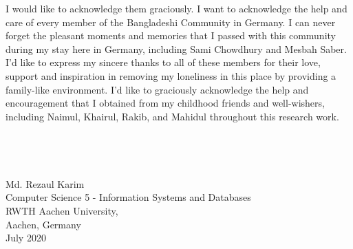 \begin{acknowledgements}
    \hspace*{5mm} I would like to acknowledge them graciously. I want to acknowledge the help and care of every member of the Bangladeshi Community in Germany. I can never forget the pleasant moments and memories that I passed with this community during my stay here in Germany, including Sami Chowdhury and Mesbah Saber. I'd like to express my sincere thanks to all of these members for their love, support and inspiration in removing my loneliness in this place by providing a family-like environment. I'd like to graciously acknowledge the help and encouragement that I obtained from my childhood friends and well-wishers, including Naimul, Khairul, Rakib, and Mahidul throughout this research work. \\ \\ %
    \\ \\ \\ 
    \flushright Md. Rezaul Karim \\
    Computer Science 5 - Information Systems and Databases\\
    RWTH Aachen University,\\ 
    Aachen, Germany \\
    July 2020
\end{acknowledgements}